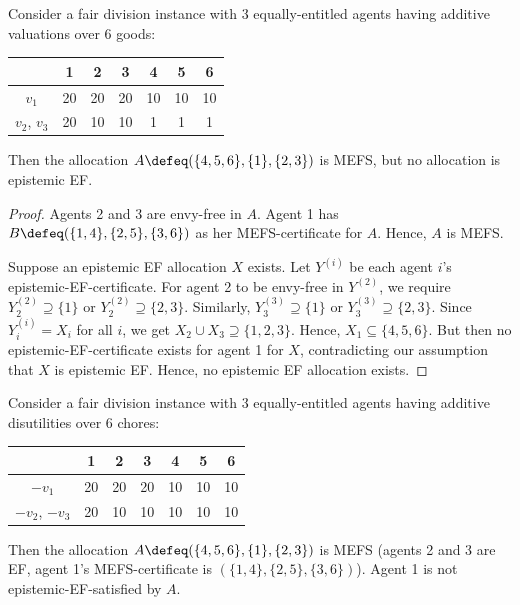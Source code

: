 \begin{lemma}
\label{cex:mefs-not-eef-goods}
Consider a fair division instance with 3 equally-entitled agents
having additive valuations over 6 goods:

\begin{tabular}{c|cccccc}
& 1 & 2 & 3 & 4 & 5 & 6
\\ \hline $v_1$ & 20 & 20 & 20 & 10 & 10 & 10
\\ $v_2$, $v_3$ & 20 & 10 & 10 &  1 &  1 &  1
\end{tabular}

Then the allocation $A \defeq (\{4, 5, 6\}, \{1\}, \{2, 3\})$ is MEFS, but no allocation is epistemic EF.
\end{lemma}
\begin{proof}
Agents 2 and 3 are envy-free in $A$.
Agent 1 has $B \defeq (\{1, 4\}, \{2, 5\}, \{3, 6\})$ as her MEFS-certificate for $A$.
Hence, $A$ is MEFS.

Suppose an epistemic EF allocation $X$ exists.
Let $Y^{(i)}$ be each agent $i$'s epistemic-EF-certificate.
For agent 2 to be envy-free in $Y^{(2)}$,
we require $Y^{(2)}_2 \supseteq \{1\}$ or $Y^{(2)}_2 \supseteq \{2, 3\}$.
Similarly, $Y^{(3)}_3 \supseteq \{1\}$ or $Y^{(3)}_3 \supseteq \{2, 3\}$.
Since $Y^{(i)}_i = X_i$ for all $i$, we get $X_2 \cup X_3 \supseteq \{1, 2, 3\}$.
Hence, $X_1 \subseteq \{4, 5, 6\}$.
But then no epistemic-EF-certificate exists for agent 1 for $X$,
contradicting our assumption that $X$ is epistemic EF.
Hence, no epistemic EF allocation exists.
\end{proof}

\begin{example}
\label{cex:mefs-not-eef-chores}
Consider a fair division instance with 3 equally-entitled agents
having additive disutilities over 6 chores:

\begin{tabular}{c|cccccc}
& 1 & 2 & 3 & 4 & 5 & 6
\\ \hline $-v_1$ & 20 & 20 & 20 & 10 & 10 & 10
\\ $-v_2$, $-v_3$ & 20 & 10 & 10 & 10 & 10 & 10
\end{tabular}

Then the allocation $A \defeq (\{4, 5, 6\}, \{1\}, \{2, 3\})$ is MEFS
(agents 2 and 3 are EF, agent 1's MEFS-certificate is $(\{1, 4\}, \{2, 5\}, \{3, 6\})$).
Agent 1 is not epistemic-EF-satisfied by $A$.
\end{example}


